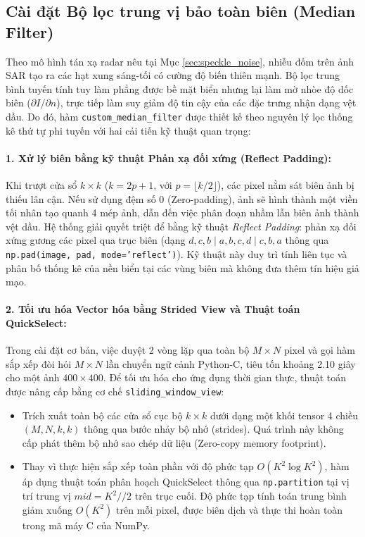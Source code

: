 \subsection{Cài đặt Bộ lọc trung vị bảo toàn biên (Median Filter)}
\label{subsec:custom_median_filter}
Theo mô hình tán xạ radar nêu tại Mục \ref{sec:speckle_noise}, nhiễu đốm trên ảnh SAR tạo ra các hạt xung sáng-tối có cường độ biến thiên mạnh. Bộ lọc trung bình tuyến tính tuy làm phẳng được bề mặt biển nhưng lại làm mờ nhòe độ dốc biên ($\partial I / \partial n$), trực tiếp làm suy giảm độ tin cậy của các đặc trưng nhận dạng vệt dầu. Do đó, hàm \texttt{custom\_median\_filter} được thiết kế theo nguyên lý lọc thống kê thứ tự phi tuyến với hai cải tiến kỹ thuật quan trọng:

\paragraph{1. Xử lý biên bằng kỹ thuật Phản xạ đối xứng (Reflect Padding):}
Khi trượt cửa sổ $k \times k$ ($k = 2p + 1$, với $p = \lfloor k/2 \rfloor$), các pixel nằm sát biên ảnh bị thiếu lân cận. Nếu sử dụng đệm số 0 (Zero-padding), ảnh sẽ hình thành một viền tối nhân tạo quanh 4 mép ảnh, dẫn đến việc phân đoạn nhầm lẫn biên ảnh thành vệt dầu. Hệ thống giải quyết triệt để bằng kỹ thuật \textit{Reflect Padding}: phản xạ đối xứng gương các pixel qua trục biên (dạng $d, c, b \mid a, b, c, d \mid c, b, a$ thông qua \texttt{np.pad(image, pad, mode='reflect')}). Kỹ thuật này duy trì tính liên tục và phân bố thống kê của nền biển tại các vùng biên mà không đưa thêm tín hiệu giả mạo.

\paragraph{2. Tối ưu hóa Vector hóa bằng Strided View và Thuật toán QuickSelect:}
Trong cài đặt cơ bản, việc duyệt 2 vòng lặp qua toàn bộ $M \times N$ pixel và gọi hàm sắp xếp đòi hỏi $M \times N$ lần chuyển ngữ cảnh Python-C, tiêu tốn khoảng 2.10 giây cho một ảnh $400 \times 400$. Để tối ưu hóa cho ứng dụng thời gian thực, thuật toán được nâng cấp bằng cơ chế \texttt{sliding\_window\_view}:
\begin{itemize}
    \item Trích xuất toàn bộ các cửa sổ cục bộ $k \times k$ dưới dạng một khối tensor 4 chiều $(M, N, k, k)$ thông qua bước nhảy bộ nhớ (strides). Quá trình này không cấp phát thêm bộ nhớ sao chép dữ liệu (Zero-copy memory footprint).
    \item Thay vì thực hiện sắp xếp toàn phần với độ phức tạp $O(K^2 \log K^2)$, hàm áp dụng thuật toán phân hoạch QuickSelect thông qua \texttt{np.partition} tại vị trí trung vị $mid = K^2 // 2$ trên trục cuối. Độ phức tạp tính toán trung bình giảm xuống $O(K^2)$ trên mỗi pixel, được biên dịch và thực thi hoàn toàn trong mã máy C của NumPy.
\end{itemize}

